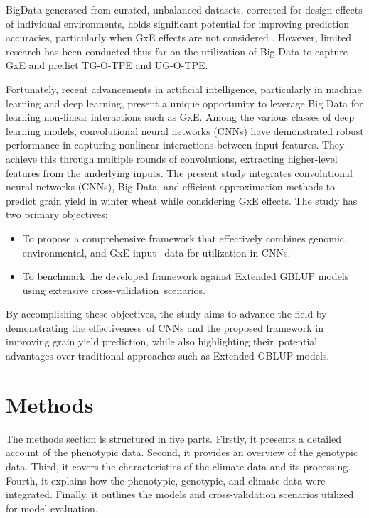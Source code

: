 \documentclass[english, biblatex]{lni}
\begin{document}
BigData generated from curated, unbalanced datasets, corrected for design effects of individual environments, holds significant potential for improving prediction accuracies, particularly when GxE effects are not considered \cite{zhao2021unlocking}. However, limited research has been conducted thus far on the utilization of Big Data to capture GxE and predict TG-O-TPE and UG-O-TPE.

Fortunately, recent advancements in artificial intelligence, particularly in machine learning and deep learning, present a unique opportunity to leverage Big Data for learning non-linear interactions such as GxE. Among the various classes of deep learning models, convolutional neural networks (CNNs) have demonstrated robust performance in capturing nonlinear interactions between input features. They achieve this through multiple rounds of convolutions, extracting higher-level features from the underlying inputs. The present study integrates convolutional neural networks (CNNs), Big Data, and efficient approximation methods to predict grain yield in winter wheat while considering GxE effects. The study has two primary objectives:

\begin{itemize}
    \item To propose a comprehensive framework that effectively combines genomic, environmental, and GxE input \
data for utilization in CNNs.
    \item To benchmark the developed framework against Extended GBLUP models using extensive cross-validation\ 
scenarios.
\end{itemize}

By accomplishing these objectives, the study aims to advance the field by demonstrating the effectiveness\
of CNNs and the proposed framework in improving grain yield prediction, while also highlighting their\ 
potential advantages over traditional approaches such as Extended GBLUP models.

\section{Methods}
The methods section is structured in five parts. Firstly, it presents a detailed account of the phenotypic data. Second, it provides an overview of the genotypic data. Third, it covers the characteristics of the climate data and its processing. Fourth, it explains how the phenotypic, genotypic, and climate data were integrated. Finally, it outlines the models and cross-validation scenarios utilized for model evaluation.
\end{document}

